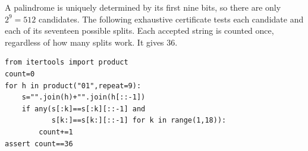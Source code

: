 A palindrome is uniquely determined by its first nine bits, so there are only $2^9=512$ candidates. The following exhaustive certificate tests each candidate and each of its seventeen possible splits. Each accepted string is counted once, regardless of how many splits work. It gives $\boxed{36}$.\begin{verbatim}
from itertools import product
count=0
for h in product("01",repeat=9):
    s="".join(h)+"".join(h[::-1])
    if any(s[:k]==s[:k][::-1] and
           s[k:]==s[k:][::-1] for k in range(1,18)):
        count+=1
assert count==36
\end{verbatim}
